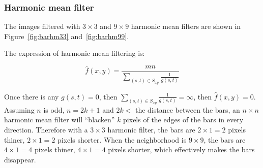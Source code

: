 \documentclass{article}
\begin{document}
\subsubsection{Harmonic mean filter}

The images filtered with $3 \times 3$ and $9 \times 9$ harmonic mean filters are shown in Figure~\ref{fig:barhm33} and~\ref{fig:barhm99}.

The expression of harmonic mean filtering is:

$$
\hat{f}(x, y) = \frac{mn}{\sum_{(s, t)\in S_{xy}} \frac{1}{g(s, t)}}
$$

Once there is any $g(s, t) = 0$, then $\sum_{(s, t)\in S_{xy}} \frac{1}{g(s, t)} = \infty$, then $\hat{f}(x, y) = 0$. Assuming $n$ is odd, $n = 2k + 1$ and $2k <$ the distance between the bars, an $n \times n$ harmonic mean filter will ``blacken'' $k$ pixels of the edges of the bars in every direction. Therefore with a $3 \times 3$ harmonic filter, the bars are $2 \times 1 = 2$ pixels thiner, $2 \times 1 = 2$ pixels shorter. When the neighborhood is $9 \times 9$, the bars are $4 \times 1 = 4$ pixels thiner, $4 \times 1 = 4$ pixels shorter, which effectively makes the bars disappear.
\end{document}
